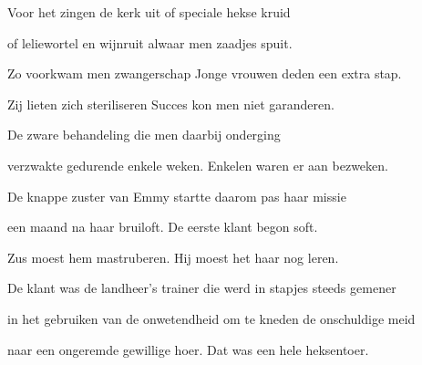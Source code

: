 Voor het zingen de kerk uit
of speciale hekse kruid

of leliewortel en wijnruit
alwaar men zaadjes spuit.

Zo voorkwam men zwangerschap
Jonge vrouwen deden een extra stap.

Zij lieten zich steriliseren
Succes kon men niet garanderen.

De zware behandeling
die men daarbij onderging

verzwakte gedurende enkele weken.
Enkelen waren er aan bezweken.

De knappe zuster van Emmy
startte daarom pas haar missie

een maand na haar bruiloft.
De eerste klant begon soft.

Zus moest hem mastruberen.
Hij moest het haar nog leren.

De klant was de landheer’s trainer
die werd in stapjes steeds gemener

in het gebruiken van de onwetendheid
om te kneden de onschuldige meid

naar een ongeremde gewillige hoer.
Dat was een hele heksentoer.
